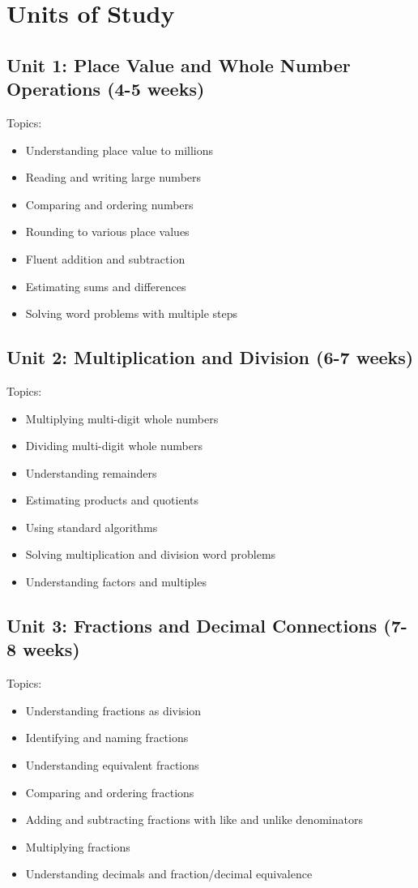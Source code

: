 \documentclass[11pt,letterpaper]{report}
\begin{document}
\section{Units of Study}

\subsection{Unit 1: Place Value and Whole Number Operations (4-5 weeks)}

Topics:
\begin{itemize}
\item Understanding place value to millions
\item Reading and writing large numbers
\item Comparing and ordering numbers
\item Rounding to various place values
\item Fluent addition and subtraction
\item Estimating sums and differences
\item Solving word problems with multiple steps
\end{itemize}

\subsection{Unit 2: Multiplication and Division (6-7 weeks)}

Topics:
\begin{itemize}
\item Multiplying multi-digit whole numbers
\item Dividing multi-digit whole numbers
\item Understanding remainders
\item Estimating products and quotients
\item Using standard algorithms
\item Solving multiplication and division word problems
\item Understanding factors and multiples
\end{itemize}

\subsection{Unit 3: Fractions and Decimal Connections (7-8 weeks)}

Topics:
\begin{itemize}
\item Understanding fractions as division
\item Identifying and naming fractions
\item Understanding equivalent fractions
\item Comparing and ordering fractions
\item Adding and subtracting fractions with like and unlike denominators
\item Multiplying fractions
\item Understanding decimals and fraction/decimal equivalence
\end{itemize}
\end{document}
